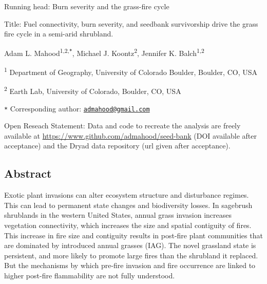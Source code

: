 \documentclass[
  12pt,
]{article}
\author{}
\date{\vspace{-2.5em}}
\begin{document}

Running head: Burn severity and the grass-fire cycle

Title: Fuel connectivity, burn severity, and seedbank survivorship drive
the grass fire cycle in a semi-arid shrubland.

Adam L. Mahood\textsuperscript{1,2,\texttt{*}}, Michael J.
Koontz\textsuperscript{2}, Jennifer K. Balch\textsuperscript{1,2}

\small

\textsuperscript{1} Department of Geography, University of Colorado
Boulder, Boulder, CO, USA

\textsuperscript{2} Earth Lab, University of Colorado, Boulder, CO, USA

\texttt{*} Corresponding author:
\href{mailto:admahood@gmail.com}{\nolinkurl{admahood@gmail.com}}

\normalsize

Open Reseach Statement: Data and code to recreate the analysis are
freely available at \url{https://www.github.com/admahood/seed-bank} (DOI
available after acceptance) and the Dryad data repository (url given
after acceptance).

\newpage

\linenumbers

\hypertarget{abstract}{%
\subsection{Abstract}\label{abstract}}

Exotic plant invasions can alter ecosystem structure and disturbance
regimes. This can lead to permanent state changes and biodiversity
losses. In sagebrush shrublands in the western United States, annual
grass invasion increases vegetation connectivity, which increases the
size and spatial contiguity of fires. This increase in fire size and
contiguity results in post-fire plant communities that are dominated by
introduced annual grasses (IAG). The novel grassland state is
persistent, and more likely to promote large fires than the shrubland it
replaced. But the mechanisms by which pre-fire invasion and fire
occurrence are linked to higher post-fire flammability are not fully
understood.
\end{document}
